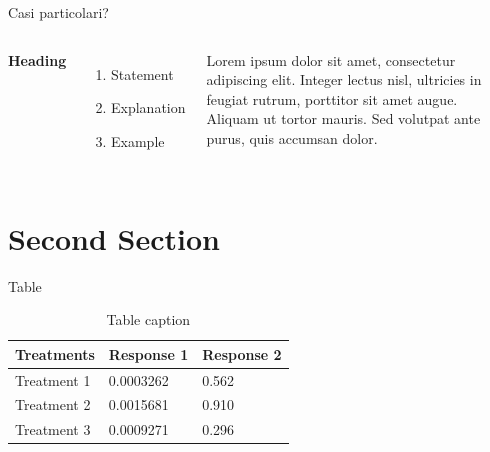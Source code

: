 \documentclass[aspectratio=169,xcolor=dvipsnames]{beamer}
\begin{document}

\begin{frame}{Casi particolari?}
    \begin{columns}[c] %

        \textbf{Heading}
        \begin{enumerate}
            \item Statement
            \item Explanation
            \item Example
        \end{enumerate}

        Lorem ipsum dolor sit amet, consectetur adipiscing elit. Integer lectus nisl, ultricies in feugiat rutrum, porttitor sit amet augue. Aliquam ut tortor mauris. Sed volutpat ante purus, quis accumsan dolor.

    \end{columns}
\end{frame}

\section{Second Section}

\begin{frame}{Table}
    \begin{table}
        \begin{tabular}{l l l}
            \toprule
            \textbf{Treatments} & \textbf{Response 1} & \textbf{Response 2} \\
            \midrule
            Treatment 1         & 0.0003262           & 0.562               \\
            Treatment 2         & 0.0015681           & 0.910               \\
            Treatment 3         & 0.0009271           & 0.296               \\
            \bottomrule
        \end{tabular}
        \caption{Table caption}
    \end{table}
\end{frame}

\end{document}
